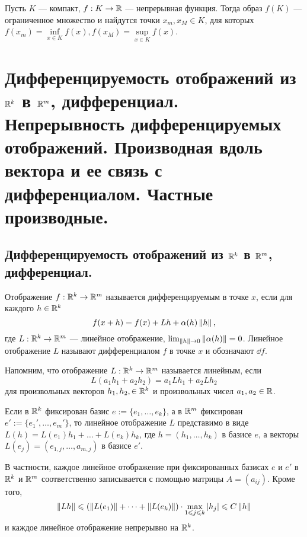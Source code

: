 \documentclass[a4paper]{article}
\theoremstyle{named}
\begin{document}
    \begin{consequence*}
        Пусть $K$ --- компакт, $f: K \to \mathbb{R}$ --- непрерывная функция. Тогда образ $f(K)$ --- ограниченное множество и найдутся точки $x_m, x_M \in K$, для которых $f(x_m) = \inf\limits_{x \in K} f(x), f(x_M) = \sup\limits_{x \in K} f(x)$.
    \end{consequence*}

    \section{Дифференцируемость отображений из $\mathbb{R}^k$ в $\mathbb{R}^m$, дифференциал. Непрерывность дифференцируемых отображений. Производная вдоль вектора и ее связь с дифференциалом. Частные производные.}

    \subsection{Дифференцируемость отображений из $\mathbb{R}^k$ в $\mathbb{R}^m$, дифференциал.}

    \begin{definition*}
        Отображение $f: \mathbb{R}^k \to \mathbb{R}^m$ называется дифференцируемым в точке $x$, если для каждого $h \in \mathbb{R}^k$
        \begin{equation*}
            f(x + h) = f(x) + Lh + \alpha(h) \left\lVert h\right\rVert,
        \end{equation*}
        где $L: \mathbb{R}^k \to \mathbb{R}^m$ --- линейное отображение, $\lim_{\left\lVert h\right\rVert \to 0} \left\lVert\alpha(h)\right\rVert = 0$. Линейное отображение $L$ называют дифференциалом $f$ в точке $x$ и обозначают $\dd f$.
    \end{definition*}

    \begin{remark*}
        Напомним, что отображение $L: \mathbb{R}^k \to \mathbb{R}^m$ называется линейным, если
        \begin{equation*}
            L(a_1h_1 + a_2h_2) = a_1Lh_1 + a_2Lh_2
        \end{equation*}
        для произвольных векторов $h_1, h_2, \in \mathbb{R}^k$ и произвольных чисел $a_1, a_2 \in \mathbb{R}$. 
        
        Если в $\mathbb{R}^k$ фиксирован базис $e := \{e_1, \dots, e_k\}$, а в $\mathbb{R}^m$ фиксирован $e' := \{e_1', \dots, e_m'\}$, то линейное отображение $L$ представимо в виде $L(h) = L(e_1)h_1 + \dots + L(e_k)h_k$, где $h = (h_1, \dots, h_k)$ в базисе $e$, а векторы $L(e_j) = (e_{1,j}, \dots, a_{m, j})$ в базисе $e'$. 

        В частности, каждое линейное отображение при фиксированных базисах $e$ и $e'$ в $\mathbb{R}^k$ и $\mathbb{R}^m$ соответственно записывается с помощью матрицы $A = (a_{ij})$. Кроме того,
        \begin{equation*}
            \left\lVert Lh\right\rVert \leqslant (\left\lVert L(e_1)\right\rVert + \dots + \left\lVert L(e_k)\right\rVert) \cdot \max\limits_{1 \leqslant j \leqslant k} |h_j| \leqslant C \left\lVert h\right\rVert
        \end{equation*}
        и каждое линейное отображение непрерывно на $\mathbb{R}^k$.
    \end{remark*}
\end{document}
